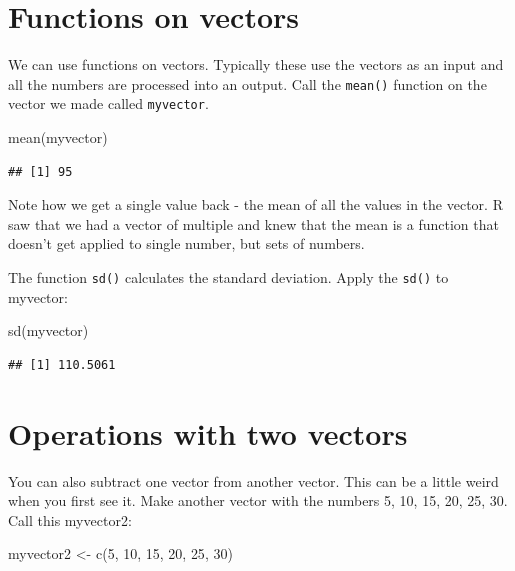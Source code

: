 \documentclass[
]{book}
\newenvironment{Shaded}{\begin{snugshade}}{\end{snugshade}}
\newcommand{\DecValTok}[1]{\textcolor[rgb]{0.00,0.00,0.81}{#1}}
\newcommand{\FunctionTok}[1]{\textcolor[rgb]{0.00,0.00,0.00}{#1}}
\newcommand{\NormalTok}[1]{#1}
\newcommand{\OtherTok}[1]{\textcolor[rgb]{0.56,0.35,0.01}{#1}}
\begin{document}
\hypertarget{functions-on-vectors}{%
\section{Functions on vectors}\label{functions-on-vectors}}

We can use functions on vectors. Typically these use the vectors as an input and all the numbers are processed into an output. Call the \texttt{mean()} function on the vector we made called \texttt{myvector}.

\begin{Shaded}
\begin{Highlighting}[]
\FunctionTok{mean}\NormalTok{(myvector)}
\end{Highlighting}
\end{Shaded}

\begin{verbatim}
## [1] 95
\end{verbatim}

Note how we get a single value back - the mean of all the values in the vector. R saw that we had a vector of multiple and knew that the mean is a function that doesn't get applied to single number, but sets of numbers.

The function \texttt{sd()} calculates the standard deviation. Apply the \texttt{sd()} to myvector:

\begin{Shaded}
\begin{Highlighting}[]
\FunctionTok{sd}\NormalTok{(myvector)}
\end{Highlighting}
\end{Shaded}

\begin{verbatim}
## [1] 110.5061
\end{verbatim}

\hypertarget{operations-with-two-vectors}{%
\section{Operations with two vectors}\label{operations-with-two-vectors}}

You can also subtract one vector from another vector. This can be a little weird when you first see it. Make another vector with the numbers 5, 10, 15, 20, 25, 30. Call this myvector2:

\begin{Shaded}
\begin{Highlighting}[]
\NormalTok{myvector2 }\OtherTok{\textless{}{-}} \FunctionTok{c}\NormalTok{(}\DecValTok{5}\NormalTok{, }\DecValTok{10}\NormalTok{, }\DecValTok{15}\NormalTok{, }\DecValTok{20}\NormalTok{, }\DecValTok{25}\NormalTok{, }\DecValTok{30}\NormalTok{)}
\end{Highlighting}
\end{Shaded}
\end{document}
